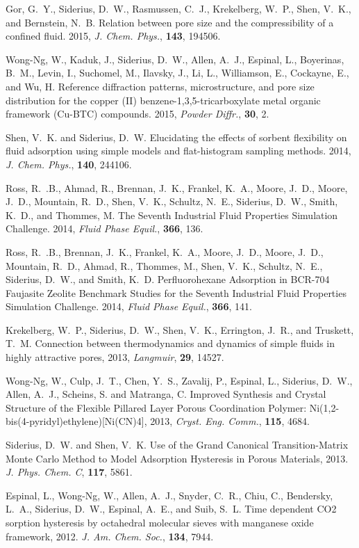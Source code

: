 Gor, G.~Y., Siderius, D.~W., Rasmussen, C.~J., Krekelberg, W.~P., Shen, V.~K., and Bernstein, N.~B. Relation between pore size and the compressibility of a confined fluid. 2015, {\it J. Chem. Phys.}, {\bf 143}, 194506.

Wong-Ng, W., Kaduk, J., Siderius, D.~W., Allen, A.~J., Espinal, L., Boyerinas, B.~M., Levin, I., Suchomel, M., Ilavsky, J., Li, L., Williamson, E., Cockayne, E., and Wu, H. Reference diffraction patterns, microstructure, and pore size distribution for the copper (II) benzene-1,3,5-tricarboxylate metal organic framework ({Cu-BTC}) compounds. 2015, {\it Powder Diffr.}, {\bf 30}, 2.

Shen, V.~K. and Siderius, D.~W. Elucidating the effects of sorbent flexibility on fluid adsorption using simple models and flat-histogram sampling methods. 2014, {\it J. Chem. Phys.}, {\bf 140}, 244106.

Ross, R.~.B., Ahmad, R., Brennan, J.~K., Frankel, K.~A., Moore, J.~D., Moore, J.~D., Mountain, R.~D., Shen, V.~K., Schultz, N.~E., Siderius, D.~W., Smith, K.~D., and Thommes, M. The Seventh Industrial Fluid Properties Simulation Challenge. 2014, {\it Fluid Phase Equil.}, {\bf 366}, 136.

Ross, R.~.B., Brennan, J.~K., Frankel, K.~A., Moore, J.~D., Moore, J.~D., Mountain, R.~D., Ahmad, R., Thommes, M., Shen, V.~K., Schultz, N.~E., Siderius, D.~W., and Smith, K.~D. Perfluorohexane Adsorption in BCR-704 Faujasite Zeolite Benchmark Studies for the Seventh Industrial Fluid Properties Simulation Challenge. 2014, {\it Fluid Phase Equil.}, {\bf 366}, 141.

Krekelberg, W.~P., Siderius, D.~W., Shen, V.~K., Errington, J.~R., and Truskett, T.~M. Connection between thermodynamics and dynamics of simple fluids in highly attractive pores, 2013, {\it Langmuir}, {\bf 29},  14527.

Wong-Ng, W., Culp, J.~T., Chen, Y.~S., Zavalij, P., Espinal, L., Siderius, D.~W., Allen, A.~J., Scheins, S. and Matranga, C. Improved Synthesis and Crystal Structure of the Flexible Pillared Layer Porous Coordination Polymer: Ni(1,2-bis(4-pyridyl)ethylene)[Ni(CN)4], 2013, {\it Cryst. Eng. Comm.}, {\bf 115}, 4684.

Siderius, D.~W. and Shen, V.~K. Use of the Grand Canonical Transition-Matrix Monte Carlo Method to Model Adsorption Hysteresis in Porous Materials, 2013. {\it J. Phys. Chem. C}, {\bf 117}, 5861.

Espinal, L., Wong-Ng, W., Allen, A.~J., Snyder, C.~R., Chiu, C., Bendersky, L.~A., Siderius, D.~W., Espinal, A.~E., and Suib, S.~L. Time dependent CO2 sorption hysteresis by octahedral molecular sieves with manganese oxide framework, 2012. {\it J. Am. Chem. Soc.}, {\bf 134}, 7944.

